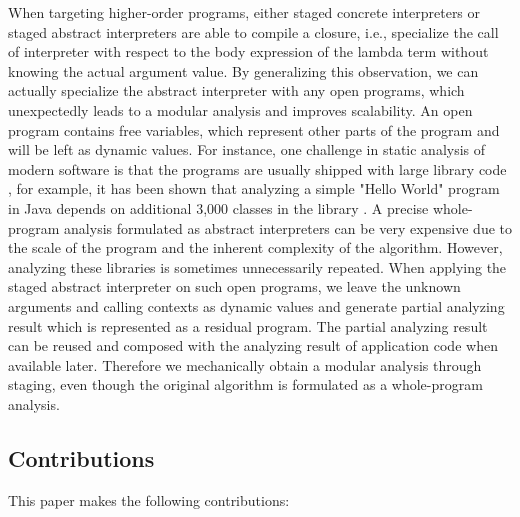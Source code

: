 When targeting higher-order programs, either staged concrete interpreters or
staged abstract interpreters are able to compile a closure, i.e., specialize the
call of interpreter with respect to the body expression of the lambda term
without knowing the actual argument value. By generalizing this observation, we
can actually specialize the abstract interpreter with any open programs, which
unexpectedly leads to a modular analysis and improves scalability. An open
program contains free variables, which represent other parts of the program and
will be left as dynamic values. For instance, one challenge in static analysis
of modern software is that the programs are usually shipped with large library
code \cite{toman_et_al:LIPIcs:2017:7121}, for example, it has been shown that
analyzing a simple "Hello World" program in Java depends on additional 3,000
classes in the library \cite{DBLP:conf/oopsla/KulkarniMZN16}. A precise
whole-program analysis formulated as abstract interpreters can be very expensive
due to the scale of the program and the inherent complexity of the algorithm.
However, analyzing these libraries is sometimes unnecessarily repeated. When
applying the staged abstract interpreter on such open programs, we leave the
unknown arguments and calling contexts as dynamic values and generate partial
analyzing result which is represented as a residual program. The partial
analyzing result can be reused and composed with the analyzing result of
application code when available later. Therefore we mechanically obtain a
modular analysis through staging, even though the original algorithm is
formulated as a whole-program analysis.

\iffalse
It has been observed that partially applying context-sensitivity on selected
portion of the program could improve the precision and efficiency
\cite{zipper2018, Kastrinis:2013:HCP:2491956.2462191}. We show that staging
abstract interpreters as an approach to effectively implement hybird
context-sensitivity\todo{}.
\fi


\subsection{Contributions}

This paper makes the following contributions:

